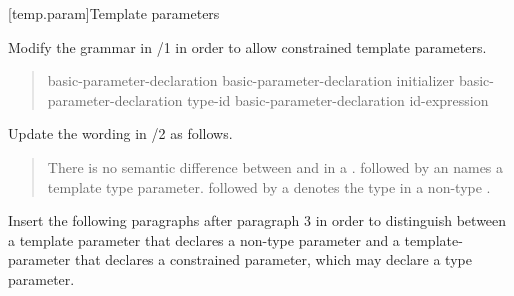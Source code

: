 [temp.param]{Template parameters}

Modify the 
grammar in /1 in order
to allow constrained template parameters.

\begin{quote}
\begin{bnf}
\br
  \br

\begin{addedblock}
\br
  basic-parameter-declaration\br
  basic-parameter-declaration \terminal{=} initializer\br
  basic-parameter-declaration \terminal{=} type-id\br
  basic-parameter-declaration \terminal{=} id-expression
\end{addedblock}
\end{bnf}
\end{quote}
    
Update the wording in /2 as follows.

\begin{quote}
\setcounter{Paras}{1}
\pnum
There is no semantic difference between  and  
in a .  
followed by an  names a 
template type parameter.  followed by a 
 denotes the
type in a non-type 
. 
\end{quote}

Insert the following paragraphs after paragraph 3 in order to distinguish
between a template parameter that declares a non-type parameter and a
template-parameter that declares a constrained parameter, which may
declare a type parameter. 


